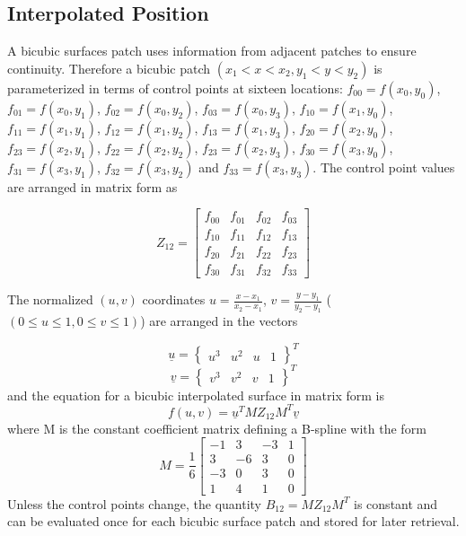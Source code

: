 \documentclass[
10pt, %
a4paper, %
oneside, %
headinclude,footinclude, %
BCOR5mm, %
]{scrartcl}
\begin{document}
\subsection{Interpolated Position}
A bicubic surfaces patch uses information from adjacent patches to ensure continuity. Therefore a bicubic patch $(x_1 < x < x_2, y_1 < y < y_2)$ is parameterized in terms of control points at sixteen locations: $f_{00} = f(x_0, y_0)$, $f_{01} = f(x_0, y_1)$, $f_{02} = f(x_0, y_2)$, $f_{03} = f(x_0, y_3)$, $f_{10} = f(x_1, y_0)$, $f_{11} = f(x_1, y_1)$, $f_{12} = f(x_1, y_2)$, $f_{13} = f(x_1, y_3)$, $f_{20} = f(x_2, y_0)$, $f_{23} = f(x_2, y_1)$, $f_{22} = f(x_2, y_2)$, $f_{23} = f(x_2, y_3)$, $f_{30} = f(x_3, y_0)$, $f_{31} = f(x_3, y_1)$, $f_{32} = f(x_3, y_2)$ and $f_{33} = f(x_3, y_3)$. The control point values are arranged in matrix form as

\begin{equation}
Z_{12} = \begin{bmatrix}
f_{00} & f_{01} & f_{02} & f_{03}\\
f_{10} & f_{11} & f_{12} & f_{13}\\
f_{20} & f_{21} & f_{22} & f_{23}\\
f_{30} & f_{31} & f_{32} & f_{33}
\end{bmatrix}
\end{equation}

The normalized $(u,v)$ coordinates $u=\frac{x-x_1}{x_2 - x_1}$, $v=\frac{y-y_1}{y_2 - y_1}$ ($(0 \leq u \leq 1, 0 \leq v \leq 1)$) are arranged in the vectors

\begin{equation}
 \underline{u} = \begin{Bmatrix} u^3 & u^2 & u & 1 \end{Bmatrix}^T
\end{equation}
\begin{equation}
 \underline{v} = \begin{Bmatrix} v^3 & v^2 & v & 1 \end{Bmatrix}^T
\end{equation}
and the equation for a bicubic interpolated surface in matrix form is
\begin{equation}
f(u,v) =
\underline{u}^T M Z_{12} M^T \underline{v}
\end{equation}
where M is the constant coefficient matrix defining a B-spline \cite{rogers2000introduction,joy2000bicubic} with the form
\begin{equation}
M = \frac{1}{6}
  \begin{bmatrix}
    -1 & 3 & -3 & 1\\
    3 & -6 & 3 & 0\\
    -3 & 0 & 3 & 0\\
    1 & 4 & 1 & 0
  \end{bmatrix}
\end{equation}
Unless the control points change, the quantity $B_{12} = M Z_{12} M^T$ is constant and can be evaluated once for each bicubic surface patch and stored for later retrieval.
\end{document}
